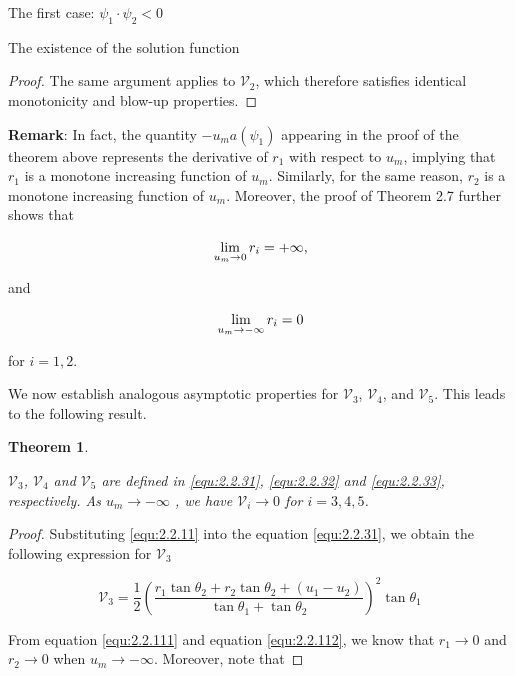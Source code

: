 \documentclass[letterpaper,reqno,10pt,twoside]{amsart}
\newtheorem{theorem}{Theorem}[section]
\theoremstyle{definition}
\theoremstyle{remark}
\begin{document}
\begin{section}{The first case: $\psi_1\cdot \psi_2<0$ }
\begin{subsection}{The existence of the solution function}
\begin{proof}
       The same argument applies to $\mathscr{V}_{2}$, which therefore satisfies identical monotonicity and blow-up properties.
    \end{proof}

    \textbf{Remark}: In fact, the quantity $-u_{m}a(\psi_1)$ appearing in the proof of the theorem above represents the derivative of $r_1$ with respect to $u_{m}$, implying that $r_1$ is a monotone increasing function of $u_m$. Similarly, for the same reason, $r_2$ is a monotone increasing function of $u_m$. Moreover, the proof of Theorem 2.7 further shows that

    \begin{equation}{\label{equ:2.2.111}}
    \lim_{u_{m}\rightarrow 0} r_i=+\infty,
    \end{equation}

    \noindent and

    \begin{equation}{\label{equ:2.2.112}}
        \lim_{u_{m}\rightarrow -\infty} r_i=0
    \end{equation}

    \noindent for $i=1,2$.
    
    We now establish analogous asymptotic properties for $\mathscr{V}_{3}$, $\mathscr{V}_{4}$, and $\mathscr{V}_{5}$. This leads to the following result.

    \begin{theorem}{\label{thm:v_3}}

        $\mathscr{V}_{3}$, $\mathscr{V}_{4}$ and $\mathscr{V}_{5}$ are defined in \eqref{equ:2.2.31}, \eqref{equ:2.2.32} and \eqref{equ:2.2.33}, respectively. As $u_{m}\rightarrow -\infty$ , we have $\mathscr{V}_{i} \rightarrow 0$ for $i=3,4,5$. 
    \end{theorem}


    \begin{proof}

          Substituting \eqref{equ:2.2.11} into the equation \eqref{equ:2.2.31}, we obtain the following expression for $\mathscr{V}_{3}$

        \begin{equation}\label{equ:2.2.35}
            \mathscr{V}_{3}=\frac{1}{2}(\frac{r_1\tan\theta_2+r_2\tan\theta_2+(u_1-u_2)}{\tan\theta_1+\tan\theta_{2}})^{2}\tan\theta_1
        \end{equation}

         From equation \eqref{equ:2.2.111} and equation \eqref{equ:2.2.112}, we know that $r_1\rightarrow 0$ and $r_{2}\rightarrow 0$ when $u_m\rightarrow -\infty$. Moreover, note that


\end{proof}
\end{subsection}
\end{section}
\end{document}
